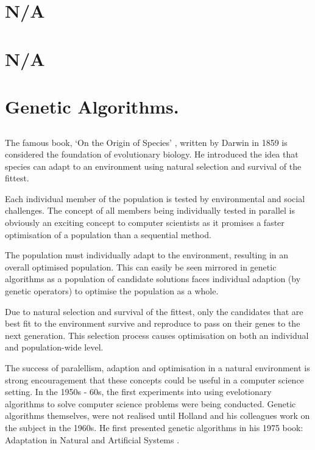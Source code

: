 \documentclass[a4paper]{report}
\begin{document}
\section{N/A}
\section{N/A}
\section{Genetic Algorithms.}
\subsection{}
The famous book, `On the Origin of Species' \cite{darwin1859}, written by Darwin in 1859 is considered the foundation of evolutionary biology. He introduced the idea that species can adapt to an environment using natural selection and survival of the fittest.

Each individual member of the population is tested by environmental and social challenges. The concept of all members being individually tested in parallel is obviously an exciting concept to computer scientists as it promises a faster optimisation of a population than a sequential method.

The population must individually adapt to the environment, resulting in an overall optimised population. This can easily be seen mirrored in genetic algorithms as a population of candidate solutions faces individual adaption (by genetic operators) to optimise the population as a whole.

Due to natural selection and survival of the fittest, only the candidates that are best fit to the environment survive and reproduce to pass on their genes to the next generation. This selection process causes optimisation on both an individual and population-wide level.

The success of paralellism, adaption and optimisation in a natural environment is strong encouragement that these concepts could be useful in a computer science setting. In the 1950s - 60s, the first experiments into using evelotionary algorithms to solve computer science problems were being conducted. Genetic algorithms themselves, were not realised until Holland and his colleagues work on the subject in the 1960s. He first presented genetic algorithms in his 1975 book: Adaptation in Natural and Artificial Systems \cite{Holland1975}.
\end{document}
